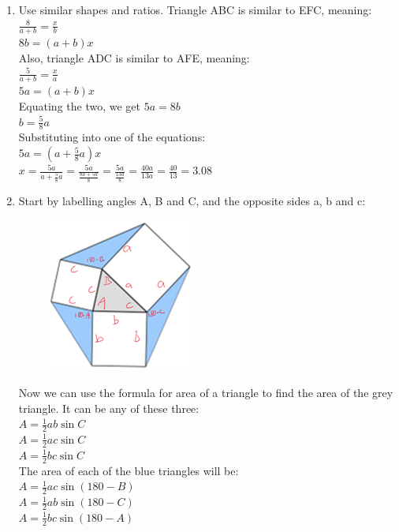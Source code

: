 \documentclass[../main.tex]{subfiles}
\begin{document}
\begin{enumerate}
    \item 
    Use similar shapes and ratios. Triangle ABC is similar to EFC, meaning:\\
    \(\frac{8}{a+b}=\frac{x}{b}\)\\
    \(8b=(a+b)x\)\\

    Also, triangle ADC is similar to AFE, meaning:\\
    \(\frac{5}{a+b}=\frac{x}{a}\)\\
    \(5a=(a+b)x\)\\

    Equating the two, we get \(5a=8b\)\\
    \(b=\frac{5}{8}a\)\\

    Substituting into one of the equations:\\
    \(5a=(a+\frac{5}{8}a)x\)\\

    \(x=\frac{5a}{a+\frac{5}{8}a}=\frac{5a}{\frac{8a+5a}{8}}=\frac{5a}{\frac{13a}{8}}=\frac{40a}{13a}=\frac{40}{13}=3.08\)\\

    \item 
    Start by labelling angles A, B and C, and the opposite sides a, b and c:
    \begin{figure}[H]
        \centering
        \includegraphics[width=0.25\linewidth]{images/t1w10q3_a.png}
    \end{figure}

    Now we can use the formula for area of a triangle to find the area of the grey triangle. It can be any of these three:\\
    \(A=\frac{1}{2}ab\sin{C}\)\\
    \(A=\frac{1}{2}ac\sin{C}\)\\
    \(A=\frac{1}{2}bc\sin{C}\)\\

    The area of each of the blue triangles will be:\\
    \(A=\frac{1}{2}ac\sin{(180-B)}\)\\
    \(A=\frac{1}{2}ab\sin{(180-C)}\)\\
    \(A=\frac{1}{2}bc\sin{(180-A)}\)\\


\end{enumerate}
\end{document}
